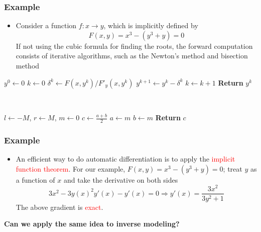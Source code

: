 \documentclass[usenames,dvipsnames]{beamer}
\begin{document}
\begin{frame}
	\frametitle{Example}
	
	\begin{itemize}
		\item Consider a function $f:x\rightarrow y$, which is implicitly defined by 
		$$F(x,y) = x^3 - (y^3+y) = 0$$
		If not using the cubic formula for finding the roots, the forward computation consists of iterative algorithms, such as the Newton's method and bisection method
	\end{itemize}
	
	
	
	\begin{minipage}[t]{0.48\textwidth}
		\centering
		\begin{algorithmic}
			\State $y^0 \gets 0$
			\State $k \gets 0$
			\State $\delta^k \gets F(x, y^k)/F'_y(x,y^k)$
			\State $y^{k+1}\gets y^k - \delta^k$
			\State $k \gets k+1$
			\EndWhile
			\State \textbf{Return} $y^k$
		\end{algorithmic}
	\end{minipage}~
	\begin{minipage}[t]{0.48\textwidth}
		\centering
		\begin{algorithmic}
			\State $l \gets -M$, $r\gets M$, $m\gets 0$
			\While {$|F(x, m)|>\epsilon$}
			\State $c \gets \frac{a+b}{2}$
			\If{$F(x, m)>0$}
			\State $a\gets m$
			\Else
			\State $b\gets m$
			\EndIf
			\EndWhile
			\State \textbf{Return} $c$
		\end{algorithmic}
		
	\end{minipage}	
	
\end{frame}

\begin{frame}
	\frametitle{Example}
	
	\begin{itemize}
		\item An efficient way to do automatic differentiation is to apply the \textcolor{red}{implicit function theorem}. For our example, $F(x,y)=x^3-(y^3+y)=0$; treat $y$ as a function of $x$ and take the derivative on both sides
		$$3x^2 - 3y(x)^2y'(x)-y'(x)=0\Rightarrow y'(x) = \frac{3x^2}{3y^2+1}$$
		The above gradient is \textcolor{red}{exact}.
	\end{itemize}
	\begin{center}
		\textbf{Can we apply the same idea to inverse modeling?}
	\end{center}
	
\end{frame}
\end{document}
